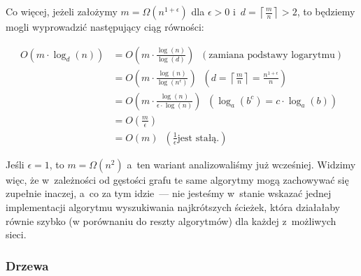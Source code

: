 Co więcej, jeżeli założymy $m = \Omega \left( n^{1+\epsilon} \right)$ dla $\epsilon > 0$ i~$d = \left \lceil \frac{m}{n} \right \rceil > 2$, to będziemy mogli wyprowadzić następujący ciąg równości:

\begin{equation}
	\begin{aligned}
		O \left( m \cdot \log_{d} \left( n \right) \right) &= O \left( m \cdot \frac{\log \left( n \right)}{\log \left( d \right)} \right) \; \; \left( \textrm{zamiana podstawy logarytmu} \right) \\
		&= O \left( m \cdot \frac{\log \left( n \right)}{\log \left( n^{\epsilon} \right)} \right) \; \; \left( d = \left \lceil \frac{m}{n} \right \rceil = \frac{n^{1+\epsilon}}{n} \right) \\
		&= O \left( m \cdot \frac{\log \left( n \right)}{ \epsilon \cdot \log \left( n \right)} \right) \; \; \left( \log_{a} \left( b^{c} \right) = c \cdot \log_{a} \left( b \right) \right) \\
		&= O \left( \frac{m}{\epsilon} \right) \\
		&= O \left( m \right) \; \; \left( \frac{1}{\epsilon} \textrm{jest stałą.} \right)
	\end{aligned}
\end{equation}


Jeśli $\epsilon = 1$, to $ m = \Omega \left( n^{2} \right)$ a~ten wariant analizowaliśmy już wcześniej. Widzimy więc, że w~zależności od gęstości grafu te same algorytmy mogą zachowywać się zupełnie inaczej, a~co za tym idzie~--- nie jesteśmy w~stanie wskazać jednej implementacji algorytmu wyszukiwania najkrótszych ścieżek, która działałaby równie szybko (w porównaniu do reszty algorytmów) dla każdej z~możliwych sieci.

\subsubsection{Drzewa}

